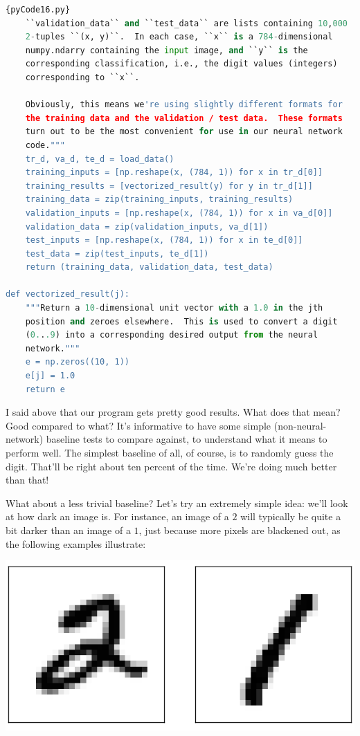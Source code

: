 \documentclass[a4paper,12pt]{report}%
\begin{document}
\begin{lstlisting}[language=Python,breaklines,basicstyle=\footnotesize\ttfamily]{pyCode16.py}
    ``validation_data`` and ``test_data`` are lists containing 10,000
    2-tuples ``(x, y)``.  In each case, ``x`` is a 784-dimensional
    numpy.ndarry containing the input image, and ``y`` is the
    corresponding classification, i.e., the digit values (integers)
    corresponding to ``x``.

    Obviously, this means we're using slightly different formats for
    the training data and the validation / test data.  These formats
    turn out to be the most convenient for use in our neural network
    code."""
    tr_d, va_d, te_d = load_data()
    training_inputs = [np.reshape(x, (784, 1)) for x in tr_d[0]]
    training_results = [vectorized_result(y) for y in tr_d[1]]
    training_data = zip(training_inputs, training_results)
    validation_inputs = [np.reshape(x, (784, 1)) for x in va_d[0]]
    validation_data = zip(validation_inputs, va_d[1])
    test_inputs = [np.reshape(x, (784, 1)) for x in te_d[0]]
    test_data = zip(test_inputs, te_d[1])
    return (training_data, validation_data, test_data)

def vectorized_result(j):
    """Return a 10-dimensional unit vector with a 1.0 in the jth
    position and zeroes elsewhere.  This is used to convert a digit
    (0...9) into a corresponding desired output from the neural
    network."""
    e = np.zeros((10, 1))
    e[j] = 1.0
    return e
\end{lstlisting}

I said above that our program gets pretty good results. What does that mean? Good compared to what? It's informative to have some simple (non-neural-network) baseline tests to compare against, to understand what it means to perform well. The simplest baseline of all, of course, is to randomly guess the digit. That'll be right about ten percent of the time. We're doing much better than that!

What about a less trivial baseline? Let's try an extremely simple idea: we'll look at how dark an image is. For instance, an image of a $2$ will typically be quite a bit darker than an image of a $1$, just because more pixels are blackened out, as the following examples illustrate:

\begin{center}
 \includegraphics[width=0.25\linewidth]{images/mnist_2_and_1.png}
\end{center}
\end{document}
